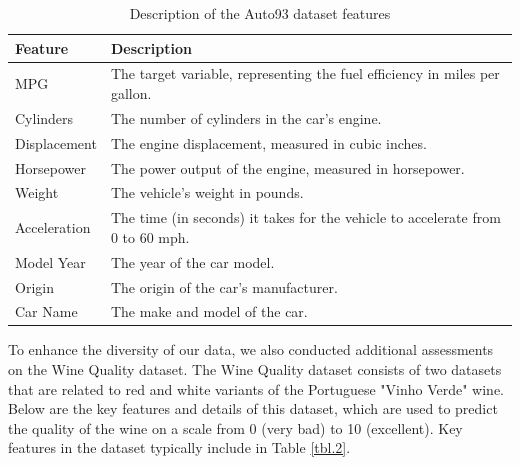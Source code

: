 \documentclass{ieeeaccess}
\begin{document}
\begin{table}[h!]
    \centering
    \begin{tabular}{|>{\raggedright\arraybackslash}p{3cm}|>{\raggedright\arraybackslash}p{9cm}|}
    \hline
    \textbf{Feature} & \textbf{Description} \\
    \hline
    MPG & The target variable, representing the fuel efficiency in miles per gallon. \\
    \hline
    Cylinders & The number of cylinders in the car's engine. \\
    \hline
    Displacement & The engine displacement, measured in cubic inches. \\
    \hline
    Horsepower & The power output of the engine, measured in horsepower. \\
    \hline
    Weight & The vehicle's weight in pounds. \\
    \hline
    Acceleration & The time (in seconds) it takes for the vehicle to accelerate from 0 to 60 mph. \\
    \hline
    Model Year & The year of the car model. \\
    \hline
    Origin & The origin of the car's manufacturer. \\
    \hline
    Car Name & The make and model of the car. \\
    \hline
    \end{tabular}
    \caption{Description of the Auto93 dataset features}
    \label{tbl.1}
    \end{table}

To enhance the diversity of our data, we also conducted additional assessments on the Wine Quality dataset. The Wine Quality dataset consists of two datasets that are related to red and white variants of the Portuguese "Vinho Verde" wine. Below are the key features and details of this dataset, which are used to predict the quality of the wine on a scale from 0 (very bad) to 10 (excellent)\cite{cortez2009}. Key features in the dataset typically include in Table \ref{tbl.2}.
\end{document}
